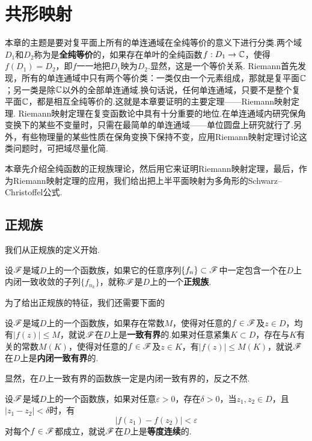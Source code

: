 \chapter{共形映射\label{chap7}}
本章的主题是要对复平面上所有的单连通域在全纯等价的意义下进行分类.两个域$D_1$和$D_2$称为是\textbf{全纯等价}的，如果存在单叶的全纯函数$f:D_1\to\mathbb C$，使得$f(D_1)=D_2$，即$f$一一地把$D_1$映为$D_2$.显然，这是一个等价关系. Riemann首先发现，所有的单连通域中只有两个等价类：一类仅由一个元素组成，那就是复平面$\mathbb C$；另一类是除$\mathbb C$以外的全部单连通域.换句话说，任何单连通域，只要不是整个复平面$\mathbb C$，都是相互全纯等价的.这就是本章要证明的主要定理——Riemann映射定理. Riemann映射定理在复变函数论中具有十分重要的地位.在单连通域内研究保角变换下的某些不变量时，只需在最简单的单连通域——单位圆盘上研究就行了.另外，有些物理量的某些性质在保角变换下保持不变，应用Riemann映射定理讨论这类问题时，可把域尽量化简.

本章先介绍全纯函数的正规族理论，然后用它来证明Riemann映射定理，最后，作为Riemann映射定理的应用，我们给出把上半平面映射为多角形的Schwarz--Christoffel公式.

\section{正规族\label{sec7.1}}
我们从正规族的定义开始.
\begin{definition}\label{def7.1.1}
  设$\mathscr F$是域$D$上的一个函数族，如果它的任意序列$\{f_n\}\subset \mathscr F$中一定包含一个在$D$上内闭一致收敛的子列$\{f_{n_k}\}$，就称$\mathscr F$是$D$上的一个\textbf{正规族}.
\end{definition}

为了给出正规族的特征，我们还需要下面的

\begin{definition}\label{def7.1.2}
  设$\mathscr F$是域$D$上的一个函数族，如果存在常数$M$，使得对任意的$f\in\mathscr F$及$z\in D$，均有$|f(z)|\le M$，就说$\mathscr F$在$D$上是\textbf{一致有界}的.如果对任意紧集$K\subset D$，存在与$K$有关的常数$M(K)$，使得对任意的$f\in\mathscr F$及$z\in K$，有$|f(z)|\le M(K)$，就说$\mathscr F$在$D$上是\textbf{内闭一致有界}的.
\end{definition}

显然，在$D$上一致有界的函数族一定是内闭一致有界的，反之不然.
\begin{definition}\label{def7.1.3}
  设$\mathscr F$是域$D$上的一个函数族，如果对任意$\varepsilon>0$，存在$\delta>0$，当$z_1,z_2\in D$，且$|z_1-z_2|<\delta$时，有
  \[
    |f(z_1) - f(z_2)| < \varepsilon
  \]
  对每个$f\in\mathscr F$都成立，就说$\mathscr F$在$D$上是\textbf{等度连续}的.
\end{definition}


